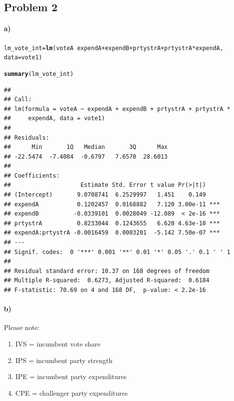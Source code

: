 \documentclass[12pt]{article}\usepackage[]{graphicx}\usepackage[]{color}
\makeatletter
\newcommand{\hlopt}[1]{\textcolor[rgb]{0,0,0}{#1}}%
\newcommand{\hlstd}[1]{\textcolor[rgb]{0.345,0.345,0.345}{#1}}%
\newcommand{\hlkwb}[1]{\textcolor[rgb]{0.69,0.353,0.396}{#1}}%
\newcommand{\hlkwc}[1]{\textcolor[rgb]{0.333,0.667,0.333}{#1}}%
\newcommand{\hlkwd}[1]{\textcolor[rgb]{0.737,0.353,0.396}{\textbf{#1}}}%
\newenvironment{kframe}{%
 \def\at@end@of@kframe{}%
 \ifinner\ifhmode%
  \def\at@end@of@kframe{\end{minipage}}%
  \begin{minipage}{\columnwidth}%
 \fi\fi%
 \def\FrameCommand##1{\hskip\@totalleftmargin \hskip-\fboxsep
 \colorbox{shadecolor}{##1}\hskip-\fboxsep
     \hskip-\linewidth \hskip-\@totalleftmargin \hskip\columnwidth}%
 \MakeFramed {\advance\hsize-\width
   \@totalleftmargin\z@ \linewidth\hsize
   \@setminipage}}%
 {\par\unskip\endMakeFramed%
 \at@end@of@kframe}
\newenvironment{knitrout}{}{} %
\makeatother
\begin{document}
\subsection*{Problem 2}

\paragraph{a)}

\begin{knitrout}
\color{fgcolor}\begin{kframe}
\begin{alltt}
\hlstd{lm_vote_int} \hlkwb{=} \hlkwd{lm}\hlstd{(voteA} \hlopt{~} \hlstd{expendA} \hlopt{+} \hlstd{expendB} \hlopt{+} \hlstd{prtystrA} \hlopt{+} \hlstd{prtystrA} \hlopt{*} \hlstd{expendA,}
    \hlkwc{data} \hlstd{= vote1)}

\hlkwd{summary}\hlstd{(lm_vote_int)}
\end{alltt}
\begin{verbatim}
## 
## Call:
## lm(formula = voteA ~ expendA + expendB + prtystrA + prtystrA * 
##     expendA, data = vote1)
## 
## Residuals:
##      Min       1Q   Median       3Q      Max 
## -22.5474  -7.4084  -0.6797   7.6570  28.6013 
## 
## Coefficients:
##                    Estimate Std. Error t value Pr(>|t|)    
## (Intercept)       9.0708741  6.2529997   1.451    0.149    
## expendA           0.1202457  0.0168882   7.120 3.00e-11 ***
## expendB          -0.0339101  0.0028049 -12.089  < 2e-16 ***
## prtystrA          0.8233044  0.1243655   6.620 4.63e-10 ***
## expendA:prtystrA -0.0016459  0.0003201  -5.142 7.50e-07 ***
## ---
## Signif. codes:  0 '***' 0.001 '**' 0.01 '*' 0.05 '.' 0.1 ' ' 1
## 
## Residual standard error: 10.37 on 168 degrees of freedom
## Multiple R-squared:  0.6273,	Adjusted R-squared:  0.6184 
## F-statistic: 70.69 on 4 and 168 DF,  p-value: < 2.2e-16
\end{verbatim}
\end{kframe}
\end{knitrout}

\paragraph{b)}

Please note:

\begin{enumerate}
  \item IVS = incumbent vote share
  \item IPS = incumbent party strength
  \item IPE = incumbent party expenditures
  \item CPE = challenger party expenditures
\end{enumerate}
\end{document}
